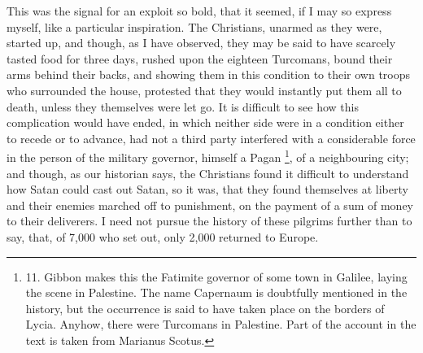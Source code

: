 This was the signal for an
exploit so bold, that it seemed, if I may so express myself, like a
particular inspiration. The Christians, unarmed as they were,
started up, and though, as I have observed, they may be said to have
scarcely tasted food for three days, rushed upon the eighteen
Turcomans, bound their arms behind their backs, and showing them in
this condition to their own troops who surrounded the house, protested
that they would instantly put them all to death, unless they
themselves were let go. It is difficult to see how this complication
would have ended, in which neither side were in a condition either to
recede or to advance, had not a third party interfered with a
considerable force in the person of the military governor, himself a
Pagan \footnote{11.
Gibbon makes this the Fatimite governor of some town in Galilee,
laying the scene in Palestine. The name Capernaum is doubtfully
mentioned in the history, but the occurrence is said to have taken
place on the borders of Lycia. Anyhow, there were Turcomans in
Palestine. Part of the account in the text is taken from Marianus
Scotus.}, of a
neighbouring city; and though, as our historian says, the Christians
found it difficult to understand how Satan could cast out Satan, so it
was, that they found themselves at liberty and their enemies marched
off to punishment, on the payment of a sum of money to their
deliverers. I need not pursue the history of these pilgrims further
than to say, that, of 7,000 who set out, only 2,000 returned to
Europe.

